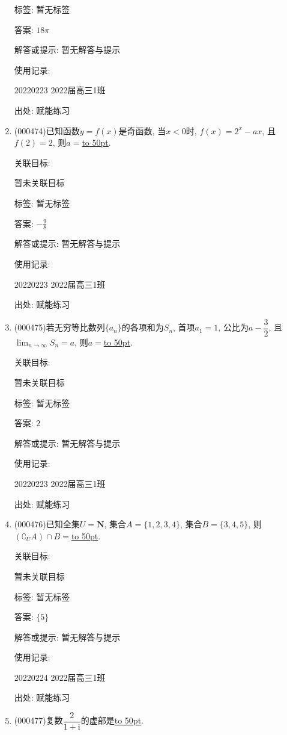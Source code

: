 \documentclass[10pt,a4paper]{article}
\newcommand{\blank}[1]{\underline{\hbox to #1pt{}}}
\begin{document}
\begin{enumerate}[1.]
标签: 暂无标签

答案: $18\pi$

解答或提示: 暂无解答与提示

使用记录:

20220223	2022届高三1班	


出处: 赋能练习
\item { (000474)}已知函数$y=f(x)$是奇函数, 当$x<0$时, $f(x)=2^x-ax$, 且$f(2)=2$, 则$a=$\blank{50}.


关联目标:

暂未关联目标



标签: 暂无标签

答案: $-\frac 98$

解答或提示: 暂无解答与提示

使用记录:

20220223	2022届高三1班	


出处: 赋能练习
\item { (000475)}若无穷等比数列$\{a_n\}$的各项和为$S_n$, 首项$a_1=1$, 公比为$a-\dfrac32$, 且$\displaystyle\lim_{n\to\infty}S_n=a$, 则$a=$\blank{50}.


关联目标:

暂未关联目标



标签: 暂无标签

答案: $2$

解答或提示: 暂无解答与提示

使用记录:

20220223	2022届高三1班	


出处: 赋能练习
\item { (000476)}已知全集$U=\mathbf{N}$, 集合$A=\{1,2,3,4\}$, 集合$B=\{3,4,5\}$, 则$(\complement_U A)\cap B=$\blank{50}.


关联目标:

暂未关联目标



标签: 暂无标签

答案: $\{5\}$

解答或提示: 暂无解答与提示

使用记录:

20220224	2022届高三1班	


出处: 赋能练习
\item { (000477)}复数$\dfrac2{1+\mathrm{i}}$的虚部是\blank{50}.



\end{enumerate}
\end{document}
